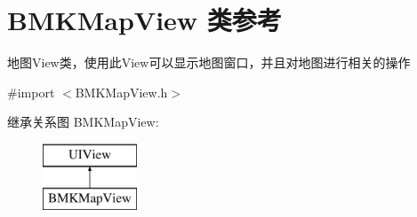\hypertarget{interface_b_m_k_map_view}{\section{B\-M\-K\-Map\-View 类参考}
\label{interface_b_m_k_map_view}
}


地图\-View类，使用此\-View可以显示地图窗口，并且对地图进行相关的操作  




{\ttfamily \#import $<$B\-M\-K\-Map\-View.\-h$>$}

继承关系图 B\-M\-K\-Map\-View\-:\begin{figure}[H]
\begin{center}
\leavevmode
\includegraphics[height=2.000000cm]{interface_b_m_k_map_view}
\end{center}
\end{figure}
